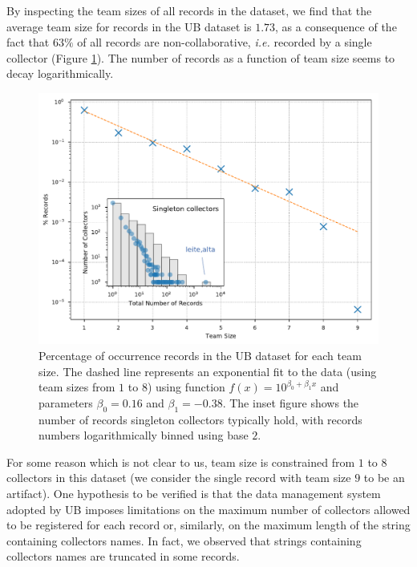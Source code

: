 By inspecting the team sizes of all records in the dataset, we find that the average team size for records in the UB dataset is $1.73$, as a consequence of the fact that $63\%$ of all records are non-collaborative, \textit{i.e.} recorded by a single collector (Figure \ref{fig:ub_team_sizes}).
The number of records as a function of team size seems to decay logarithmically.
\begin{figure}[!ht]
  	\centering
    \includegraphics[width=0.9\linewidth]{figures/casestudy_ub/team_sizes.pdf}
    \caption[Percentage of occurrence records in the UB dataset for each team size.]{ Percentage of occurrence records in the UB dataset for each team size. The dashed line represents an exponential fit to the data (using team sizes from $1$ to $8$) using function $f(x) = 10^{\beta_0 + \beta_1 x}$ and parameters $\beta_0=0.16$ and $\beta_1=-0.38$. The inset figure shows the number of records singleton collectors typically hold, with records numbers logarithmically binned using base $2$. }
    \label{fig:ub_team_sizes}
\end{figure}
%
For some reason which is not clear to us, team size is constrained from $1$ to $8$ collectors in this dataset (we consider the single record with team size $9$ to be an artifact).
One hypothesis to be verified is that the data management system adopted by UB imposes limitations on the maximum number of collectors allowed to be registered for each record or, similarly, on the maximum length of the string containing collectors names. 
In fact, we observed that strings containing collectors names are truncated in some records.

